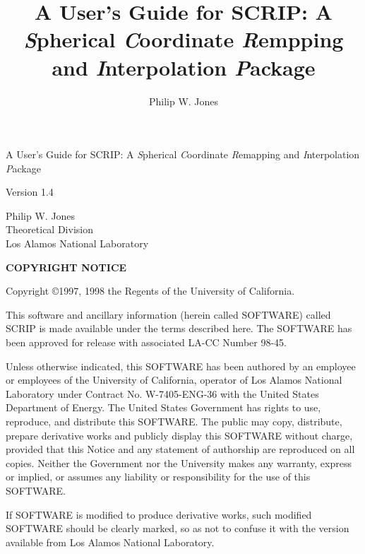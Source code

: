 \documentclass[12pt]{report}
\title{A User's Guide for SCRIP: A {\em S}pherical {\em C}oordinate
       {\em R}empping and {\em I}nterpolation {\em P}ackage }
\author{Philip W. Jones}
\begin{document}

\begin{titlepage}

\vspace{1in}

\begin{center}
{\Large{A User's Guide for SCRIP: A {\em S}pherical {\em C}oordinate
       {\em R}emapping and {\em I}nterpolation {\em P}ackage }}
\end{center}

\vspace{1in}

\begin{center}
Version 1.4
\end{center}

\vspace{1in}

\begin{center}
Philip W. Jones \\
Theoretical Division \\
Los Alamos National Laboratory
\end{center}

\newpage

\begin{center}
{\bf COPYRIGHT NOTICE}
\end{center}

Copyright \copyright 1997, 1998 the Regents of the University of
California.

\vspace{0.5in}

This software and ancillary information (herein called SOFTWARE) called
SCRIP is made available under the terms described here.  The SOFTWARE
has been approved for release with associated LA-CC Number 98-45.

Unless otherwise indicated, this SOFTWARE has been authored by an
employee or employees of the University of California, operator
of Los Alamos National Laboratory under Contract No. W-7405-ENG-36
with the United States Department of Energy.  The United States
Government has rights to use, reproduce, and distribute this
SOFTWARE.  The public may copy, distribute, prepare derivative
works and publicly display this SOFTWARE without charge, provided
that this Notice and any statement of authorship are reproduced
on all copies.  Neither the Government nor the University makes
any warranty, express or implied, or assumes any liability or
responsibility for the use of this SOFTWARE.

If SOFTWARE is modified to produce derivative works, such modified
SOFTWARE should be clearly marked, so as not to confuse it with the
version available from Los Alamos National Laboratory.


\end{titlepage}
\end{document}
